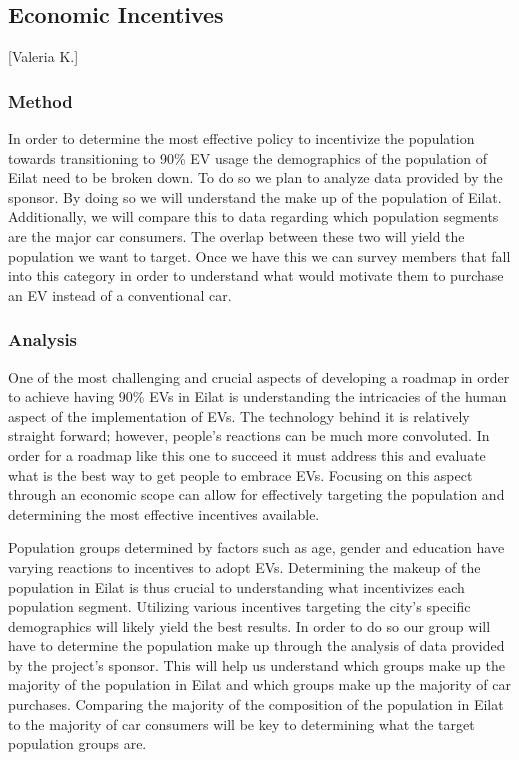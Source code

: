 \documentclass{article}                         %
\begin{document}
\subsection{Economic Incentives}[Valeria K.]
\subsubsection{Method}
In order to determine the most effective policy to incentivize the population towards transitioning to 90\% EV usage the demographics of the population of Eilat need to be broken down. To do so we plan to analyze data provided by the sponsor. By doing so we will understand the make up of the population of Eilat. Additionally, we will compare this to data regarding which population segments are the major car consumers. The overlap between these two will yield the population we want to target. Once we have this we can survey members that fall into this category in order to understand what would motivate them to purchase an EV instead of a conventional car.

\subsubsection{Analysis}
One of the most challenging and crucial aspects of developing a roadmap in order to achieve having 90\% EVs in Eilat is understanding the intricacies of the human aspect of the implementation of EVs. The technology behind it is relatively straight forward; however, people’s reactions can be much more convoluted. In order for a roadmap like this one to succeed it must address this and evaluate what is the best way to get people to embrace EVs. Focusing on this aspect through an economic scope can allow for effectively targeting the population and determining the most effective incentives available. 

Population groups determined by factors such as age, gender and education have varying reactions to incentives to adopt EVs. Determining the makeup of the population in Eilat is thus crucial to understanding what incentivizes each population segment. Utilizing various incentives targeting the city’s specific demographics will likely yield the best results. In order to do so our group will have to determine the population make up through the analysis of data provided by the project’s sponsor. This will help us understand which groups make up the majority of the population in Eilat and which groups make up the majority of car purchases. Comparing the majority of the composition of the population in Eilat to the majority of car consumers will be key to determining what the target population groups are.
\end{document}
